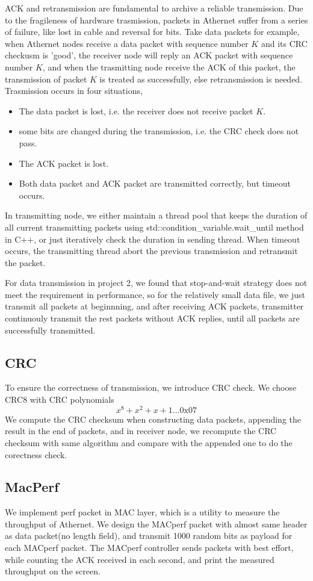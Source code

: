 \documentclass[11pt, conference]{IEEEtran}
\begin{document}
ACK and retransmission are fundamental to archive a reliable transmission. Due to the fragileness of hardware trasmission, packets in 
Athernet suffer from a series of failure, like lost in cable and reversal for bits. Take data packets for example, when Athernet nodes receive
a data packet with sequence number $K$ and its CRC checkusm is 'good', the receiver node will reply an ACK packet with sequence number $K$, and when the
trasmitting node receive the ACK of this packet, the transmission of packet $K$ is treated as successfully, else retransmission is needed. Trasmission occurs
in four situations,
\begin {itemize}
\item The data packet is lost, i.e. the receiver does not receive packet $K$.
\item some bits are changed during the transmission, i.e. the CRC check does not pass.
\item The ACK packet is lost.
\item Both data packet and ACK packet are transmitted correctly, but timeout occurs.
\end {itemize}
In transmitting node, we either maintain a thread pool that keeps the duration of all current transmitting packets using std::condition\_variable.wait\_until method
in C++, or just iteratively check the duration in sending thread. When timeout occurs, the transmitting thread abort the previous transmission and retransmit the packet.

For data transmission in project 2, we found that stop-and-wait strategy does not meet the requirement in performance, so for the relatively small data file, we just transmit all
packets at beginnning, and after receiving ACK packets, transmitter continuouly transmit the rest packets without ACK replies, until all packets are successfully transmitted.

\subsection{CRC}
To ensure the correctness of transmission, we introduce CRC check. We choose CRC8 with CRC polynomials
\[
    x^8 + x^2 + x + 1 \dots 0\text{x}07
\]
We compute the CRC checksum when constructing data packets, appending the result in the end of packets, and in receiver node, we recompute the CRC checksum with same algorithm and compare with the appended one to do the corectness check.
\subsection{MacPerf}
We implement perf packet in MAC layer, which is a utility to measure the throughput of Athernet. We design the MACperf packet with almost same header as data packet(no length field), and transmit 1000 random bits as 
payload for each MACperf packet. The MACperf controller sends packets with best effort, while counting the ACK received in each second, and print the measured throughput on the screen.
\end{document}
